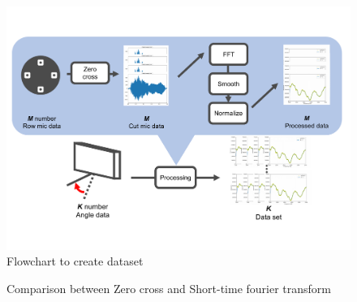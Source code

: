 \begin{figure}[ht]
  \begin{center}
  \vspace{1zh}
    \includegraphics[width=\linewidth]{images/2_how_to_make_data_set.pdf}   
  \end{center}
  \vspace{-2zh}
  \caption{Flowchart to create dataset}
  \label{fig:flow_data_set}
\end{figure}

\begin{figure}[ht]
  \centering
  \label{fig:0cross}
  \centering
  \label{fig:stft}
 \caption{Comparison between Zero cross and Short-time fourier transform}\label{fig:compare_stft_0cross}
\end{figure}

